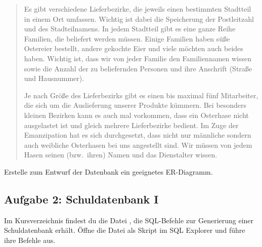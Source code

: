 \begin{quotation}
\noindent
Es gibt verschiedene Lieferbezirke, die jeweils einen bestimmten Stadtteil in
einem Ort umfassen. Wichtig ist dabei die Speicherung der Postleitzahl und des
Stadteilnamens. In jedem Stadtteil gibt es eine ganze Reihe Familien, die
beliefert werden müssen. Einige Familien haben süße Ostereier bestellt, andere
gekochte Eier und viele möchten auch beides haben. Wichtig ist, dass wir von
jeder Familie den Familiennamen wissen sowie die Anzahl der zu beliefernden
Personen und ihre Anschrift (Straße und Hausnummer).

\noindent
Je nach Größe des Lieferbezirks gibt es einen bis maximal fünf Mitarbeiter, die
sich um die Auslieferung unserer Produkte kümmern. Bei besonders kleinen
Bezirken kann es auch mal vorkommen, dass ein Osterhase nicht ausgelastet ist
und gleich mehrere Lieferbezirke bedient. Im Zuge der Emanzipation hat es sich
durchgesetzt, dass nicht nur männliche sondern auch weibliche Osterhasen bei
uns angestellt sind. Wir müssen von jedem Hasen seinen (bzw.\ ihren) Namen und
das Dienstalter wissen.
\end{quotation}

Erstelle zum Entwurf der Datenbank ein geeignetes ER-Diagramm.


\subsection{Aufgabe 2: Schuldatenbank I}

Im Kursverzeichnis findest du die Datei , die SQL-Befehle zur
Generierung einer Schuldatenbank erhält. Öffne die Datei als Skript im SQL
Explorer und führe ihre Befehle aus.

